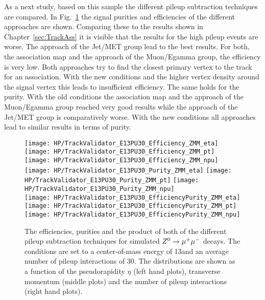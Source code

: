 As a next study, based on this sample the different pileup subtraction techniques are compared. In Fig.~\ref{plot:HPUTAE13PU30ZtomumuComp} the signal purities and efficiencies of the different approaches are shown. Comparing these to the results shown in Chapter~\ref{sec:TrackAss} it is visible that the results for the high pileup events are worse. The approach of the Jet/MET group lead to the best results. For both, the association map and the approach of the Muon/Egamma group, the efficiency is very low. Both approaches try to find the closest primary vertex to the track for an association. With the new conditions and the higher vertex density around the signal vertex this leads to insufficient efficiency. The same holds for the purity. With the old conditions the association map and the approach of the Muon/Egamma group reached very good results while the approach of the Jet/MET group is comparatively worse. With the new conditions all approaches lead to similar results in terms of purity.

\begin{figure}[!t]
  \centering
  \texttt{[image: HP/TrackValidator\_E13PU30\_Efficiency\_ZMM\_eta]}
  \texttt{[image: HP/TrackValidator\_E13PU30\_Efficiency\_ZMM\_pt]}
  \texttt{[image: HP/TrackValidator\_E13PU30\_Efficiency\_ZMM\_npu]}
   \\
  \texttt{[image: HP/TrackValidator\_E13PU30\_Purity\_ZMM\_eta]}
  \texttt{[image: HP/TrackValidator\_E13PU30\_Purity\_ZMM\_pt]}
  \texttt{[image: HP/TrackValidator\_E13PU30\_Purity\_ZMM\_npu]}
   \\
  \texttt{[image: HP/TrackValidator\_E13PU30\_EfficiencyPurity\_ZMM\_eta]}
  \texttt{[image: HP/TrackValidator\_E13PU30\_EfficiencyPurity\_ZMM\_pt]}
  \texttt{[image: HP/TrackValidator\_E13PU30\_EfficiencyPurity\_ZMM\_npu]}
  \caption[Purities, efficiencies and their product of the different pileup subtraction techniques for $\Zz\rightarrow\MM$ decays with 13\TeV and PU=30]{The efficiencies, purities and the product of both of the different pileup subtraction techniques for simulated $\Zz\rightarrow\MM$ decays. The conditions are set to a center-of-mass energy of 13\TeV and an average number of pileup interactions of 30. The distributions are shown as a function of the pseudorapidity $\eta$ (left hand plots), transverse momentum (middle plots) and the number of pileup interactions (right hand plots). \label{plot:HPUTAE13PU30ZtomumuComp}}
\end{figure}

